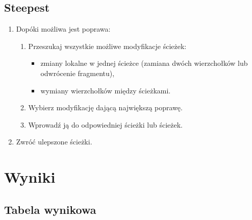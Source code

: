 \documentclass[11pt]{article}
\begin{document}
\subsection{Steepest}\label{subsec:steepest}

\begin{enumerate}
  \item Dopóki możliwa jest poprawa:
  \begin{enumerate}
    \item Przeszukaj wszystkie możliwe modyfikacje ścieżek:
    \begin{itemize}
      \item zmiany lokalne w jednej ścieżce (zamiana dwóch wierzchołków lub odwrócenie fragmentu),
      \item wymiany wierzchołków między ścieżkami.
    \end{itemize}
    \item Wybierz modyfikację dającą największą poprawę.
    \item Wprowadź ją do odpowiedniej ścieżki lub ścieżek.
  \end{enumerate}
  \item Zwróć ulepszone ścieżki.
\end{enumerate}


\section{Wyniki}\label{sec:wyniki}

\subsection{Tabela wynikowa}\label{subsec:tabela-wynikowa}
\end{document}
